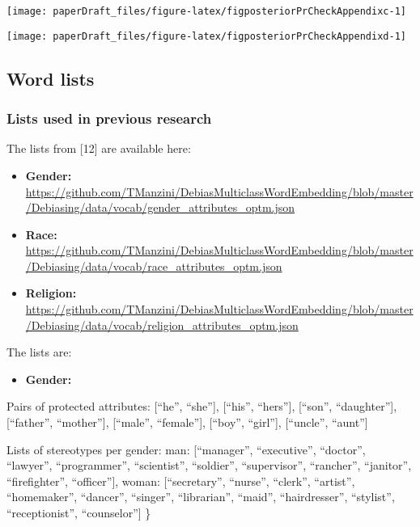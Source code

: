 \documentclass[
  12pt,
  dvipsnames,enabledeprecatedfontcommands]{scrartcl}
\providecommand{\tightlist}{%
  \setlength{\itemsep}{0pt}\setlength{\parskip}{0pt}}
\begin{document}
\begin{center}\texttt{[image: paperDraft\_files/figure-latex/figposteriorPrCheckAppendixc-1]} \end{center}

\begin{center}\texttt{[image: paperDraft\_files/figure-latex/figposteriorPrCheckAppendixd-1]} \end{center}

\hypertarget{word-lists}{%
\subsection{Word lists}\label{word-lists}}

\label{appendix:word}

\hypertarget{lists-used-in-previous-research}{%
\subsubsection{Lists used in previous
research}\label{lists-used-in-previous-research}}

\label{appendix:manzini_word_lists} The lists from {[}12{]} are
available here:

\begin{itemize}
\item
  \textbf{Gender:}
  \url{https://github.com/TManzini/DebiasMulticlassWordEmbedding/blob/master/Debiasing/data/vocab/gender_attributes_optm.json}
\item
  \textbf{Race:}
  \url{https://github.com/TManzini/DebiasMulticlassWordEmbedding/blob/master/Debiasing/data/vocab/race_attributes_optm.json}
\item
  \textbf{Religion:}
  \url{https://github.com/TManzini/DebiasMulticlassWordEmbedding/blob/master/Debiasing/data/vocab/religion_attributes_optm.json}
\end{itemize}

The lists are:

\begin{itemize}
\tightlist
\item
  \textbf{Gender:}
\end{itemize}

Pairs of protected attributes: {[}``he'', ``she''{]}, {[}``his'',
``hers''{]}, {[}``son'', ``daughter''{]}, {[}``father'', ``mother''{]},
{[}``male'', ``female''{]}, {[}``boy'', ``girl''{]}, {[}``uncle'',
``aunt''{]}

Lists of stereotypes per gender: man: {[}``manager'', ``executive'',
``doctor'', ``lawyer'', ``programmer'', ``scientist'', ``soldier'',
``supervisor'', ``rancher'', ``janitor'', ``firefighter'',
``officer''{]}, woman: {[}``secretary'', ``nurse'', ``clerk'',
``artist'', ``homemaker'', ``dancer'', ``singer'', ``librarian'',
``maid'', ``hairdresser'', ``stylist'', ``receptionist'',
``counselor''{]} \}
\end{document}
